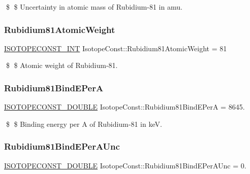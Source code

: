 \$ \$ Uncertainty in atomic mass of Rubidium-\/81 in amu. \mbox{\label{group___isotope_const-_rubidium-_rb81_ga973faa7912e512e50d7ad915da77a028}} 
\subsubsection{\texorpdfstring{Rubidium81\+Atomic\+Weight}{Rubidium81AtomicWeight}}
{\footnotesize\ttfamily \mbox{\hyperlink{group___isotope_const-_macros_ga5f18360b3e99483a35c32d789e62621c}{I\+S\+O\+T\+O\+P\+E\+C\+O\+N\+S\+T\+\_\+\+I\+NT}} Isotope\+Const\+::\+Rubidium81\+Atomic\+Weight = 81}

\$ \$ Atomic weight of Rubidium-\/81. \mbox{\label{group___isotope_const-_rubidium-_rb81_gab210ad4dd7c177d639f052da0ec49e86}} 
\subsubsection{\texorpdfstring{Rubidium81\+Bind\+E\+PerA}{Rubidium81BindEPerA}}
{\footnotesize\ttfamily \mbox{\hyperlink{group___isotope_const-_macros_ga8f45a7272ce02c0b4c65c44636ed719a}{I\+S\+O\+T\+O\+P\+E\+C\+O\+N\+S\+T\+\_\+\+D\+O\+U\+B\+LE}} Isotope\+Const\+::\+Rubidium81\+Bind\+E\+PerA = 8645.}

\$ \$ Binding energy per A of Rubidium-\/81 in keV. \mbox{\label{group___isotope_const-_rubidium-_rb81_ga3a5af0b6d6f900561b1403c0585fa5d2}} 
\subsubsection{\texorpdfstring{Rubidium81\+Bind\+E\+Per\+A\+Unc}{Rubidium81BindEPerAUnc}}
{\footnotesize\ttfamily \mbox{\hyperlink{group___isotope_const-_macros_ga8f45a7272ce02c0b4c65c44636ed719a}{I\+S\+O\+T\+O\+P\+E\+C\+O\+N\+S\+T\+\_\+\+D\+O\+U\+B\+LE}} Isotope\+Const\+::\+Rubidium81\+Bind\+E\+Per\+A\+Unc = 0.}

